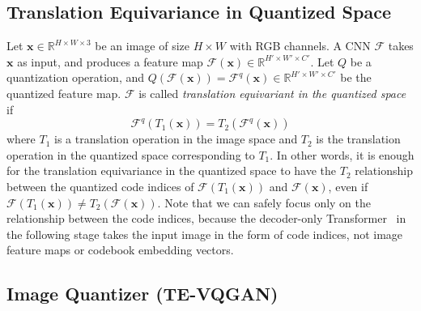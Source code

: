 \documentclass{article}
\begin{document}
\subsection{Translation Equivariance in Quantized Space}
\label{ssec:te}

Let $\mathbf{x} \in \mathbb{R}^{H \times W \times 3}$ be an image of size $H \times W$ with RGB channels. A CNN $\mathcal{F}$ takes $\mathbf{x}$ as input, and produces a feature map $\mathcal{F}(\mathbf{x}) \in \mathbb{R}^{H' \times W' \times C'}$. 
Let $Q$ be a quantization operation, and $Q(\mathcal{F}(\mathbf{x})) = \mathcal{F}^q(\mathbf{x}) \in \mathbb{R}^{H' \times W' \times C'}$ be the quantized feature map. $\mathcal{F}$ is called \emph{translation equivariant in the quantized space} if
\begin{equation} 
  \mathcal{F}^q(T_1(\mathbf{x})) = T_2(\mathcal{F}^q(\mathbf{x}))
\end{equation}
where $T_1$ is a translation operation in the image space and $T_2$ is the translation operation in the quantized space corresponding to $T_1$.
In other words, it is enough for the translation equivariance in the quantized space to have the $T_2$ relationship between the quantized code indices of $\mathcal{F}(T_1(\mathbf{x}))$ and $\mathcal{F}(\mathbf{x})$, even if $\mathcal{F}(T_1(\mathbf{x})) \neq T_2(\mathcal{F}(\mathbf{x}))$.
Note that we can safely focus only on the relationship between the code indices, because the decoder-only Transformer~\cite{vaswani2017attention} in the following stage takes the input image in the form of code indices, not image feature maps or codebook embedding vectors.

\subsection{Image Quantizer (TE-VQGAN)}
\end{document}
